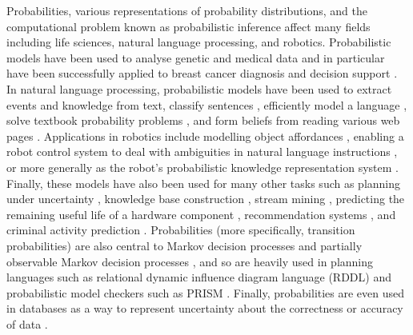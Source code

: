 \documentclass{article}
\begin{document}
Probabilities, various representations of probability distributions, and the
computational problem known as probabilistic inference affect many fields
including life sciences, natural language processing, and robotics.
Probabilistic models have been used to analyse genetic
\cite{DBLP:journals/nar/MaeyerWRRM15,DBLP:journals/jcb/SakhanenkoG12} and
medical \cite{DBLP:conf/iaai/NatarajanKIJC13} data and in particular have been
successfully applied to breast cancer diagnosis and decision support
\cite{DBLP:conf/ilp/Corte-RealD017,DBLP:conf/pkdd/NassifKBPSC13}. In natural
language processing, probabilistic models have been used to extract events
\cite{DBLP:conf/emnlp/VenugopalCGN14} and knowledge
\cite{DBLP:conf/naacl/PoonV10} from text, classify sentences
\cite{DBLP:conf/emnlp/VerbekeAMFDR12}, efficiently model a language
\cite{DBLP:conf/icml/JerniteRS15}, solve textbook probability problems
\cite{DBLP:conf/ijcai/DriesKDBR17}, and form beliefs from reading various web
pages \cite{DBLP:conf/aaai/CarlsonBKSHM10}. Applications in robotics include
modelling object affordances
\cite{DBLP:conf/icra/MoldovanMOSR12,DBLP:conf/iros/MoldovanR14,DBLP:conf/ilp/MoldovanORMS11},
enabling a robot control system to deal with ambiguities in natural language
instructions \cite{DBLP:journals/ras/BeetzJMT10}, or more generally as the
robot's probabilistic knowledge representation system
\cite{DBLP:conf/icra/JainMB09}. Finally, these models have also been used for
many other tasks such as planning under uncertainty
\cite{DBLP:journals/jair/BoutilierDH99}, knowledge base construction
\cite{DBLP:journals/ijswis/NiuZRS12}, stream mining
\cite{DBLP:conf/icdm/ChandraSKTA14}, predicting the remaining useful life of a
hardware component \cite{vlasselaer2012statistical}, recommendation systems
\cite{DBLP:journals/corr/YangKAGN16}, and criminal activity prediction
\cite{DBLP:conf/sdm/DelaneyFCWJ10}. Probabilities (more specifically, transition
probabilities) are also central to Markov decision processes
\cite{bellman1957markovian} and partially observable Markov decision processes
\cite{aastrom1965optimal}, and so are heavily used in planning languages such as
relational dynamic influence diagram language (RDDL) \cite{sanner2010relational}
and probabilistic model checkers such as PRISM
\cite{DBLP:conf/cav/KwiatkowskaNP11}. Finally, probabilities are even used in
databases as a way to represent uncertainty about the correctness or accuracy of
data \cite{DBLP:series/synthesis/2011Suciu}.
\end{document}
